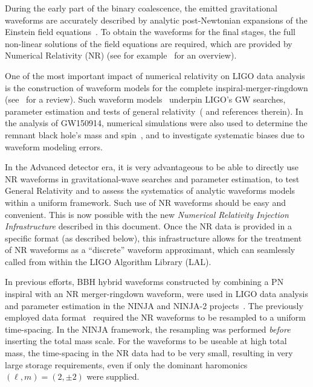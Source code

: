 \documentclass[11pt,tightenlines,article,amssymb,amsmath,amsfonts,superscriptaddress]{revtex4}
\begin{document}
During the early part of the binary coalescence, the emitted gravitational waveforms are accurately described by
analytic post-Newtonian expansions of the Einstein field equations~\cite{lrr-2014-2}. 
To obtain the waveforms for the final stages, the full non-linear solutions
of the field equations are required, which are provided by Numerical Relativity (NR) (see for example~\cite{Centrella:2010mx} for an overview).

One of the most important impact of numerical relativity on LIGO data analysis
is the construction of waveform models for the complete inspiral-merger-ringdown (see~\cite{Ohme:2011rm} for a review). Such waveform models~\cite{Khan:2015jqa, Taracchini:2013rva} underpin LIGO's  GW searches, parameter estimation and tests of general relativity~(\cite{Abbott:2016blz} and references therein).  In the analysis of GW150914, numerical simulations were also used to determine the remnant black hole's mass and spin~\cite{Healy:2014yta}, and to investigate systematic biases due to waveform modeling errors.

In the Advanced detector era, it is very advantageous to be able to directly use NR waveforms in gravitational-wave searches
and parameter estimation, to test General Relativity and to assess the systematics of analytic waveforms models within
a uniform framework. Such use of NR waveforms should be easy and convenient.
This is now possible with the new \emph{Numerical Relativity Injection Infrastructure} described in this document. Once the NR data is provided in a specific format (as described below), this infrastructure allows for the treatment of
NR waveforms as a ``discrete'' waveform approximant, which can seamlessly called from within the LIGO Algorithm Library (LAL).

In previous efforts, BBH hybrid waveforms constructed by combining a PN inspiral with an NR merger-ringdown 
waveform, were used in LIGO data analysis and parameter estimation in the NINJA and NINJA-2 projects~\cite{Aylott:2009ya, Aasi:2014tra}.  
The previously employed data format~\cite{Brown:2007jx} required the NR waveforms to be resampled to a uniform time-spacing.  In the NINJA framework, the resampling was performed \emph{before} inserting the total mass scale.  For the waveforms to be
useable at high total mass, the time-spacing in the NR data had to be very small, resulting in very large storage requirements, even if only the dominant haromonics $(\ell,m)=(2,\pm 2)$ were supplied.
\end{document}
